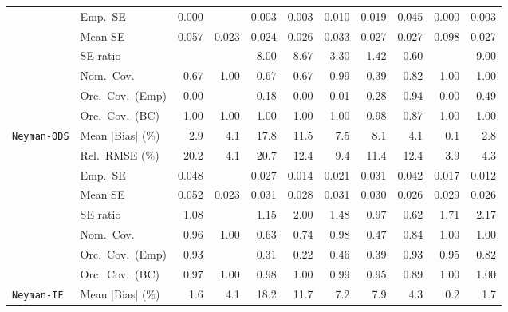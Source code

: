 \begin{landscape}
\begin{longtable}{llrrrrrrrrr}
 & Emp.\ SE & 0.000 &  & 0.003 & 0.003 & 0.010 & 0.019 & 0.045 & 0.000 & 0.003 \\
 & Mean SE & 0.057 & 0.023 & 0.024 & 0.026 & 0.033 & 0.027 & 0.027 & 0.098 & 0.027 \\
 & SE ratio &  &  & 8.00 & 8.67 & \cellcolor{rankthree}3.30 & \cellcolor{ranktwo}1.42 & \cellcolor{rankone}0.60 &  & 9.00 \\
 & Nom.\ Cov. & 0.67 & \cellcolor{ranktwo}1.00 & 0.67 & 0.67 & \cellcolor{rankone}0.99 & 0.39 & \cellcolor{rankthree}0.82 & \cellcolor{ranktwo}1.00 & \cellcolor{ranktwo}1.00 \\
 & Orc.\ Cov.\ (Emp) & 0.00 &  & 0.18 & 0.00 & 0.01 & \cellcolor{rankthree}0.28 & \cellcolor{rankone}0.94 & 0.00 & \cellcolor{ranktwo}0.49 \\
 & Orc.\ Cov.\ (BC) & \cellcolor{ranktwo}1.00 & \cellcolor{ranktwo}1.00 & \cellcolor{ranktwo}1.00 & \cellcolor{ranktwo}1.00 & \cellcolor{ranktwo}1.00 & \cellcolor{rankone}0.98 & \cellcolor{rankthree}0.87 & \cellcolor{ranktwo}1.00 & \cellcolor{ranktwo}1.00 \\
\addlinespace[2pt]
\quad \texttt{Neyman-ODS} & Mean $|$Bias$|$ (\%) & \cellcolor{rankthree}2.9 & 4.1 & 17.8 & 11.5 & 7.5 & 8.1 & 4.1 & \cellcolor{rankone}0.1 & \cellcolor{ranktwo}2.8 \\
 & Rel.\ RMSE (\%) & 20.2 & \cellcolor{ranktwo}4.1 & 20.7 & 12.4 & 9.4 & 11.4 & 12.4 & \cellcolor{rankone}3.9 & \cellcolor{rankthree}4.3 \\
 & Emp.\ SE & 0.048 &  & 0.027 & 0.014 & 0.021 & 0.031 & 0.042 & 0.017 & 0.012 \\
 & Mean SE & 0.052 & 0.023 & 0.031 & 0.028 & 0.031 & 0.030 & 0.026 & 0.029 & 0.026 \\
 & SE ratio & \cellcolor{ranktwo}1.08 &  & \cellcolor{rankthree}1.15 & 2.00 & 1.48 & \cellcolor{rankone}0.97 & 0.62 & 1.71 & 2.17 \\
 & Nom.\ Cov. & \cellcolor{rankone}0.96 & \cellcolor{rankthree}1.00 & 0.63 & 0.74 & \cellcolor{ranktwo}0.98 & 0.47 & 0.84 & \cellcolor{rankthree}1.00 & \cellcolor{rankthree}1.00 \\
 & Orc.\ Cov.\ (Emp) & \cellcolor{ranktwo}0.93 &  & 0.31 & 0.22 & 0.46 & 0.39 & \cellcolor{ranktwo}0.93 & \cellcolor{rankone}0.95 & \cellcolor{rankthree}0.82 \\
 & Orc.\ Cov.\ (BC) & \cellcolor{ranktwo}0.97 & 1.00 & \cellcolor{rankthree}0.98 & 1.00 & 0.99 & \cellcolor{rankone}0.95 & 0.89 & 1.00 & 1.00 \\
\addlinespace[2pt]
\quad \texttt{Neyman-IF} & Mean $|$Bias$|$ (\%) & \cellcolor{ranktwo}1.6 & 4.1 & 18.2 & 11.7 & 7.2 & 7.9 & 4.3 & \cellcolor{rankone}0.2 & \cellcolor{rankthree}1.7 \\

\end{longtable}
\end{landscape}

